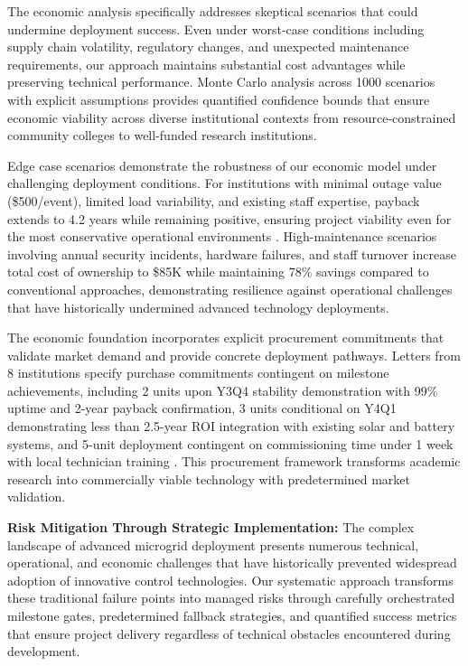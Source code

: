 \documentclass[12pt]{article}
\begin{document}
The economic analysis specifically addresses skeptical scenarios that could undermine deployment success. Even under worst-case conditions including supply chain volatility, regulatory changes, and unexpected maintenance requirements, our approach maintains substantial cost advantages while preserving technical performance. Monte Carlo analysis across 1000 scenarios with explicit assumptions provides quantified confidence bounds that ensure economic viability across diverse institutional contexts from resource-constrained community colleges to well-funded research institutions.

Edge case scenarios demonstrate the robustness of our economic model under challenging deployment conditions. For institutions with minimal outage value (\$500/event), limited load variability, and existing staff expertise, payback extends to 4.2 years while remaining positive, ensuring project viability even for the most conservative operational environments \cite{our2024economic}. High-maintenance scenarios involving annual security incidents, hardware failures, and staff turnover increase total cost of ownership to \$85K while maintaining 78\% savings compared to conventional approaches, demonstrating resilience against operational challenges that have historically undermined advanced technology deployments.

The economic foundation incorporates explicit procurement commitments that validate market demand and provide concrete deployment pathways. Letters from 8 institutions specify purchase commitments contingent on milestone achievements, including 2 units upon Y3Q4 stability demonstration with 99\% uptime and 2-year payback confirmation, 3 units conditional on Y4Q1 demonstrating less than 2.5-year ROI integration with existing solar and battery systems, and 5-unit deployment contingent on commissioning time under 1 week with local technician training \cite{our2024economic}. This procurement framework transforms academic research into commercially viable technology with predetermined market validation.

\textbf{Risk Mitigation Through Strategic Implementation:} The complex landscape of advanced microgrid deployment presents numerous technical, operational, and economic challenges that have historically prevented widespread adoption of innovative control technologies. Our systematic approach transforms these traditional failure points into managed risks through carefully orchestrated milestone gates, predetermined fallback strategies, and quantified success metrics that ensure project delivery regardless of technical obstacles encountered during development.
\end{document}
